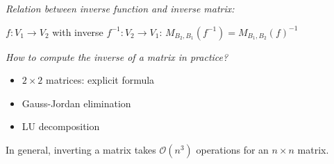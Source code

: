 \textit{Relation between inverse function and inverse matrix:}
\begin{property}
	$f:V_1 \to V_2$ with inverse $f^{-1}:V_2 \to V_1$:
	$M_{B_2,B_1}(f^{-1}) = M_{B_1,B_2}(f)^{-1}$
\end{property}

\textit{How to compute the inverse of a matrix in practice?}
\begin{itemize}
	\item $2 \times 2$ matrices: explicit formula
	\item Gauss-Jordan elimination
	\item LU decomposition
\end{itemize}

In general, inverting a matrix takes $\mathcal{O}(n^3)$ operations for an $n \times n$ matrix.


